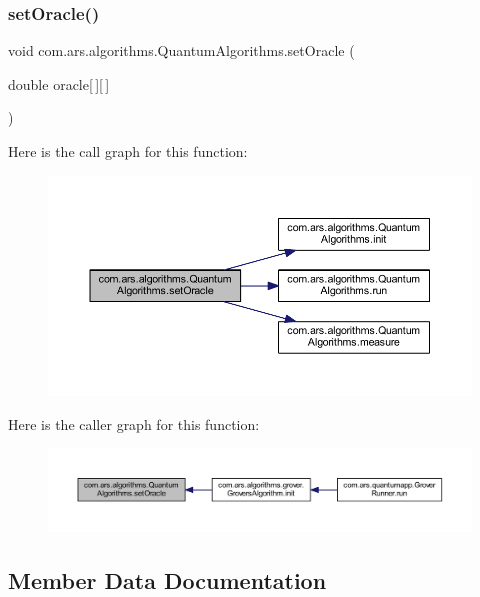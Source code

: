 \subsubsection{\texorpdfstring{set\+Oracle()}{setOracle()}}
{\footnotesize\ttfamily void com.\+ars.\+algorithms.\+Quantum\+Algorithms.\+set\+Oracle (\begin{DoxyParamCaption}\item[{double}]{oracle\mbox{[}$\,$\mbox{]}\mbox{[}$\,$\mbox{]} }\end{DoxyParamCaption})}

Here is the call graph for this function\+:\nopagebreak
\begin{figure}[H]
\begin{center}
\leavevmode
\includegraphics[width=350pt]{classcom_1_1ars_1_1algorithms_1_1_quantum_algorithms_a71cfe9109e3a0ff9c2b7e5d4cc16c4d8_cgraph}
\end{center}
\end{figure}
Here is the caller graph for this function\+:\nopagebreak
\begin{figure}[H]
\begin{center}
\leavevmode
\includegraphics[width=350pt]{classcom_1_1ars_1_1algorithms_1_1_quantum_algorithms_a71cfe9109e3a0ff9c2b7e5d4cc16c4d8_icgraph}
\end{center}
\end{figure}


\subsection{Member Data Documentation}
\hypertarget{classcom_1_1ars_1_1algorithms_1_1_quantum_algorithms_a862f92cacd8b83602459530e99791455}{}\label{classcom_1_1ars_1_1algorithms_1_1_quantum_algorithms_a862f92cacd8b83602459530e99791455} 
